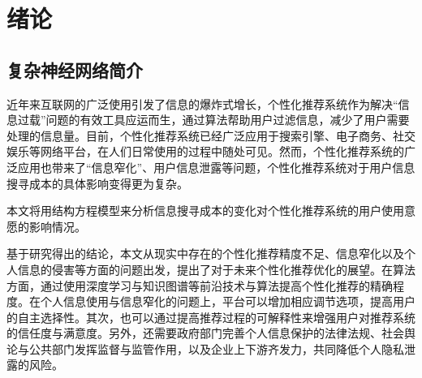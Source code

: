 \documentclass[a4paper,zihao=-4,UTF8]{ctexart}
\numberwithin{equation}{section}
\begin{document}
\newpage
\cfoot{}
\renewcommand\contentsname{\zihao{3}{\heiti{目\qquad 录}}}
\tableofcontents

\newpage
\setcounter{page}{1}
\pagestyle{fancy}
\renewcommand{\headrulewidth}{0.7pt}
\cfoot{\footnotesize \thepage }

\section{绪论}
	\subsection{复杂神经网络简介}
	近年来互联网的广泛使用引发了信息的爆炸式增长，个性化推荐系统作为解决“信息过载”问题的有效工具应运而生，通过算法帮助用户过滤信息，减少了用户需要处理的信息量。目前，个性化推荐系统已经广泛应用于搜索引擎、电子商务、社交娱乐等网络平台，在人们日常使用的过程中随处可见。然而，个性化推荐系统的广泛应用也带来了“信息窄化”、用户信息泄露等问题，个性化推荐系统对于用户信息搜寻成本的具体影响变得更为复杂。
	
	本文将用结构方程模型来分析信息搜寻成本的变化对个性化推荐系统的用户使用意愿的影响情况。
	
	基于研究得出的结论，本文从现实中存在的个性化推荐精度不足、信息窄化以及个人信息的侵害等方面的问题出发，提出了对于未来个性化推荐优化的展望。在算法方面，通过使用深度学习与知识图谱等前沿技术与算法提高个性化推荐的精确程度。在个人信息使用与信息窄化的问题上，平台可以增加相应调节选项，提高用户的自主选择性。其次，也可以通过提高推荐过程的可解释性来增强用户对推荐系统的信任度与满意度。另外，还需要政府部门完善个人信息保护的法律法规、社会舆论与公共部门发挥监督与监管作用，以及企业上下游齐发力，共同降低个人隐私泄露的风险。
\end{document}
